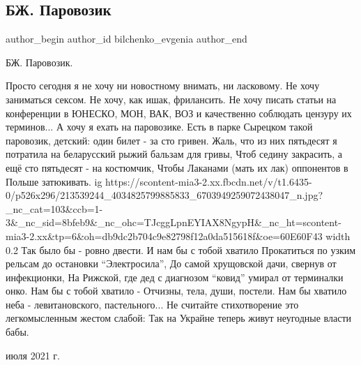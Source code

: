  
 
 
 
 
 
\subsection{БЖ. Паровозик}
\label{sec:04_07_2021.fb.bilchenko_evgenia.1.parovozik}
\ifcmt
 author_begin
   author_id bilchenko_evgenia
 author_end
\fi

\noindent БЖ. Паровозик.

\obeycr\noindent
Просто сегодня я не хочу ни новостному внимать, ни ласковому.
Не хочу заниматься сексом. Не хочу, как ишак, фрилансить.
Не хочу писать статьи на конференции в ЮНЕСКО, МОН, ВАК, ВОЗ и качественно 
соблюдать цензуру их терминов... 
А хочу я ехать на паровозике.
\smallskip
Есть в парке Сырецком такой паровозик, детский: один билет - за сто гривен.
Жаль, что из них пятьдесят я потратила на беларусский рыжий бальзам для гривы,
Чтоб седину закрасить, а ещё сто пятьдесят - на костюмчик,
Чтобы Лаканами (мать их лак) оппонентов в Польше затюкивать.
\ifcmt
  ig https://scontent-mia3-2.xx.fbcdn.net/v/t1.6435-0/p526x296/213539244_4034825799885833_6703949259072438047_n.jpg?_nc_cat=103&ccb=1-3&_nc_sid=8bfeb9&_nc_ohc=TJcggLpnEYIAX8NgypH&_nc_ht=scontent-mia3-2.xx&tp=6&oh=db9dc2b704c9e82798f12a0da515618f&oe=60E60F43
  width 0.2
\fi
\smallskip
Так было бы - ровно двести. И нам бы с тобой хватило 
Прокатиться по узким рельсам до остановки \enquote{Электросила},
До самой хрущовской дачи, свернув от инфекционки,
На Рижской, где дед с диагнозом \enquote{ковид} умирал от терминалки онко.
\smallskip
Нам бы с тобой хватило - Отчизны, тела, души, постели.
Нам бы хватило неба - левитановского, пастельного...
Не считайте стихотворение это легкомысленным жестом слабой:
Так на Украйне теперь живут неугодные власти бабы. 
\restorecr

 июля 2021 г.
